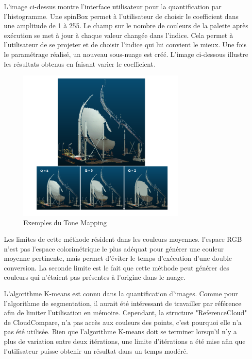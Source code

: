 \documentclass[12pt,titlepage,french]{article}
\begin{document}
L'image ci-dessus montre l'interface utilisateur pour la quantification par l'histogramme.
Une spinBox permet à l'utilisateur de choisir le coefficient dans une amplitude de 1 à 255.
 Le champ sur le nombre de couleurs de la palette après exécution se met à jour à chaque valeur changée dans l'indice. Cela permet à l'utilisateur de se projeter et de choisir l'indice qui lui convient le mieux. Une fois le paramétrage réalisé, un nouveau sous-nuage est créé. L'image ci-dessous illustre les résultats obtenus en faisant varier le coefficient.

\begin{figure}[H]
\center
\includegraphics[width=0.75\textwidth]{./img/ExpToonMapping.png}
\caption{\label{application_tonemapping} Exemples du Tone Mapping}
\end{figure}

Les limites de cette méthode résident dans les couleurs moyennes.
l'espace RGB n'est pas l'espace colorimétrique le plus adéquat pour générer une couleur moyenne pertinente, mais permet d'éviter le temps d'exécution d'une double conversion.
La seconde limite est le fait que cette méthode peut générer des couleurs qui n'étaient pas présentes à l'origine dans le nuage.
\newline

L'algorithme K-means est connu dans la quantification d'images.
Comme pour l'algorithme de segmentation, il aurait été intéressant de travailler par référence afin de limiter l'utilisation en mémoire.
Cependant, la structure "ReferenceCloud" de CloudCompare, n'a pas accès aux couleurs des points, c'est pourquoi elle n'a pas été utilisée.
Bien que l'algorithme K-means doit se terminer lorsqu'il n'y a plus de variation entre deux itérations, une limite d'itérations a été mise afin que l'utilisateur puisse obtenir un résultat dans un temps modéré.
\newline
\end{document}
